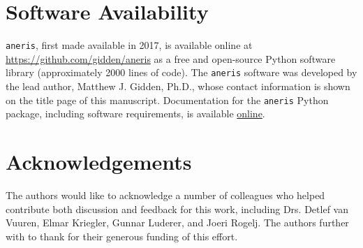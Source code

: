 \documentclass[review]{elsarticle}
\begin{document}
 
\newpage
\section*{Software Availability}

\texttt{aneris}, first made available in 2017, is available online at
\url{https://github.com/gidden/aneris} as a free and open-source Python software
library (approximately 2000 lines of code). The \texttt{aneris} software was
developed by the lead author, Matthew J. Gidden, Ph.D., whose contact
information is shown on the title page of this manuscript. Documentation for the
\texttt{aneris} Python package, including software requirements, is available
\href{http://mattgidden.com/aneris/}{online}.

\newpage




% 
% 
% 


\section*{Acknowledgements}

The authors would like to acknowledge a number of colleagues who helped
contribute both discussion and feedback for this work, including Drs. Detlef van
Vuuren, Elmar Kriegler, Gunnar Luderer, and Joeri Rogelj. The authors further
with to thank  for their generous funding of this effort.

\newpage
\section*{\refname}

\end{document}
